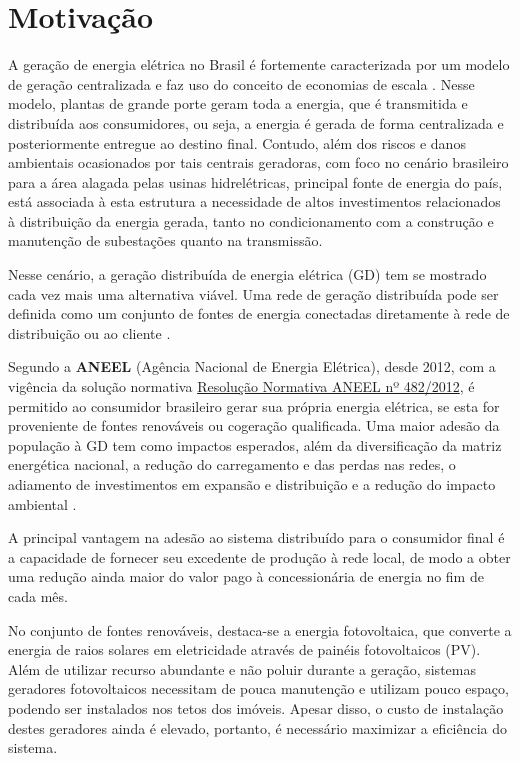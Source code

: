 \documentclass[
	12pt,				%
	openright,			%
	twoside,			%
	a4paper,			%
	english,			%
	french,				%
	spanish,			%
	brazil,				%
	]{abntex2}
\begin{document}
\section{Motivação}

	A geração de energia elétrica no Brasil é fortemente caracterizada por um modelo de geração centralizada e faz uso 
	do conceito de economias de escala \cite{MACHADO2016290}.
	Nesse modelo, plantas de grande porte geram toda a energia, que é transmitida e distribuída aos
	consumidores, ou seja, a energia é gerada de forma centralizada e posteriormente entregue ao destino final.
	Contudo, além dos riscos e danos ambientais ocasionados por tais centrais geradoras, com foco no cenário 
	brasileiro para a área alagada pelas usinas hidrelétricas, principal fonte de energia do país, 
	está associada à esta estrutura a necessidade de altos investimentos relacionados à distribuição da energia 
	gerada, tanto no condicionamento com a construção e manutenção de subestações quanto na transmissão.

	Nesse cenário, a geração distribuída de energia elétrica (GD) tem se mostrado cada vez mais uma alternativa viável.
	Uma rede de geração distribuída pode ser definida como um conjunto de fontes de energia conectadas diretamente 
	à rede de distribuição ou ao cliente \cite{ACKERMANN2001195}.

	Segundo a \textbf{ANEEL} (Agência Nacional de Energia Elétrica), desde 2012, com a vigência da solução normativa
	\href{http://www2.aneel.gov.br/cedoc/ren2012482.pdf}{Resolução Normativa ANEEL nº 482/2012}, é permitido ao 
	consumidor brasileiro gerar sua própria energia elétrica, se esta for proveniente de fontes renováveis ou cogeração qualificada.
	Uma maior adesão da população à GD tem como impactos esperados, além da diversificação da matriz energética nacional, 
	a redução do carregamento e das perdas nas redes, o adiamento de investimentos em expansão e distribuição e a redução 
	do impacto ambiental \cite{ANEEL_GD}.

	A principal vantagem na adesão ao sistema distribuído para o consumidor final é a capacidade de fornecer seu excedente de produção à rede local, de modo a obter uma redução ainda maior do valor pago à concessionária de 
	energia no fim de cada mês.

	No conjunto de fontes renováveis, destaca-se a energia fotovoltaica, que converte a energia de raios solares em eletricidade 
	através de painéis fotovoltaicos (PV). Além de utilizar recurso abundante e não poluir durante a geração, sistemas geradores 
	fotovoltaicos necessitam de pouca manutenção e utilizam pouco espaço, podendo ser instalados nos tetos dos imóveis.
	Apesar disso, o custo de instalação destes geradores ainda é elevado, portanto, é necessário maximizar a eficiência do 
	sistema.
\end{document}
